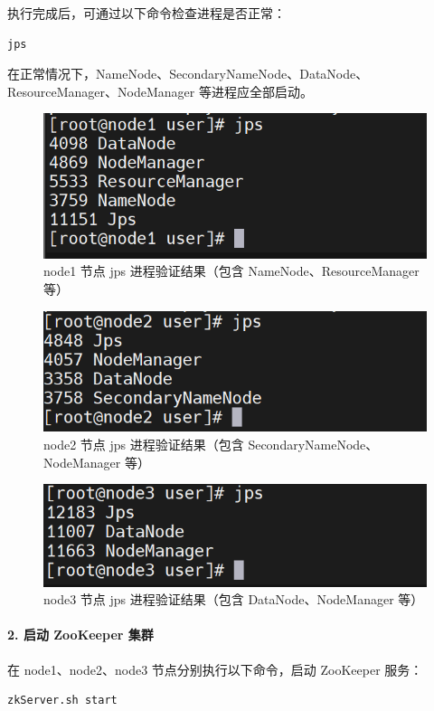 \documentclass[]{bitreport}
\begin{document}
执行完成后，可通过以下命令检查进程是否正常：
\begin{lstlisting}[style=shell]
jps
\end{lstlisting}

在正常情况下，NameNode、SecondaryNameNode、DataNode、ResourceManager、NodeManager 等进程应全部启动。

\begin{figure}[H]
  \centering
  \includegraphics[width=0.8\linewidth]{figures/jps_node1.png}
  \caption{node1 节点 jps 进程验证结果（包含 NameNode、ResourceManager 等）}
  \label{fig:jps_node1}
\end{figure}

\begin{figure}[H]
  \centering
  \includegraphics[width=0.8\linewidth]{figures/jps_node2.png}
  \caption{node2 节点 jps 进程验证结果（包含 SecondaryNameNode、NodeManager 等）}
  \label{fig:jps_node2}
\end{figure}

\begin{figure}[H]
  \centering
  \includegraphics[width=0.8\linewidth]{figures/jps_node3.png}
  \caption{node3 节点 jps 进程验证结果（包含 DataNode、NodeManager 等）}
  \label{fig:jps_node3}
\end{figure}


\paragraph{2. 启动 ZooKeeper 集群}
在 node1、node2、node3 节点分别执行以下命令，启动 ZooKeeper 服务：
\begin{lstlisting}[style=shell]
zkServer.sh start
\end{lstlisting}
\end{document}
